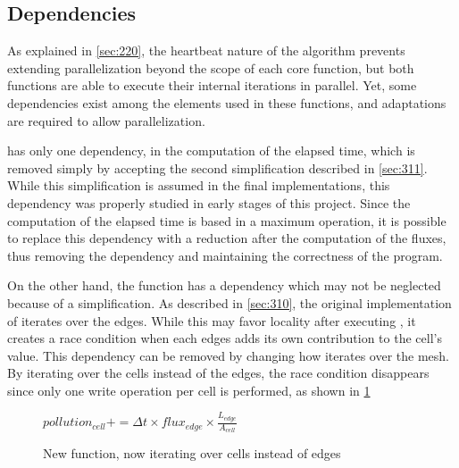 \subsection{Dependencies}
\label{sec:330}

As explained in \cref{sec:220}, the heartbeat nature of the algorithm prevents extending parallelization beyond the scope of each core function, but both functions are able to execute their internal iterations in parallel. Yet, some dependencies exist among the elements used in these functions, and adaptations are required to allow parallelization.


\computeflux has only one dependency, in the computation of the elapsed time, which is removed simply by accepting the second simplification described in \cref{sec:311}. While this simplification is assumed in the final implementations, this dependency was properly studied in early stages of this project. Since the computation of the elapsed time is based in a maximum operation, it is possible to replace this dependency with a reduction  after the computation of the fluxes, thus removing the dependency and maintaining the correctness of the program.

On the other hand, the \update function has a dependency which may not be neglected because of a simplification. As described in \cref{sec:310}, the original implementation of \update iterates over the edges. While this may favor locality after executing \computeflux, it creates a race condition when each edges adds its own contribution to the cell's value. This dependency can be removed by changing how \update iterates over the mesh. By iterating over the cells instead of the edges, the race condition disappears since only one write operation per cell is performed, as shown in \cref{alg:update2}

\begin{figure}[!htp]
	\begin{alg}
				\State $pollution_{cell} += \Delta{t} \times flux_{edge} \times \frac{L_{edge}}{A_{cell}}$
			\EndFor
		\EndFor
	\end{alg}

	\caption{New \update function, now iterating over cells instead of edges}
	\label{alg:update2}
\end{figure}
